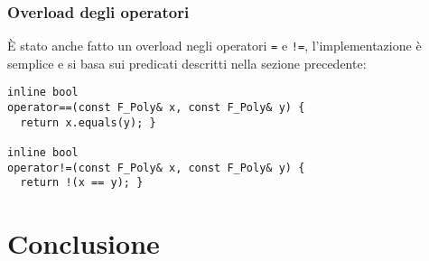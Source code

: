 \documentclass{mimosis}
\theoremstyle{definition}
\begin{document}
\subsection{Overload degli operatori}
\label{sec:orgc665ba3}
È stato anche fatto un overload negli operatori \texttt{=} e \texttt{!=}, l'implementazione è
semplice e si basa sui predicati descritti nella sezione precedente:

\lstset{style=mystyle,language=C++,label= ,caption= ,captionpos=b,numbers=none}
\begin{lstlisting}
inline bool
operator==(const F_Poly& x, const F_Poly& y) {
  return x.equals(y); }

inline bool
operator!=(const F_Poly& x, const F_Poly& y) {
  return !(x == y); }
\end{lstlisting}
\chapter{Conclusione}
\label{sec:orgabfb10d}


\renewcommand\bibname{Bibliografia}

\end{document}
